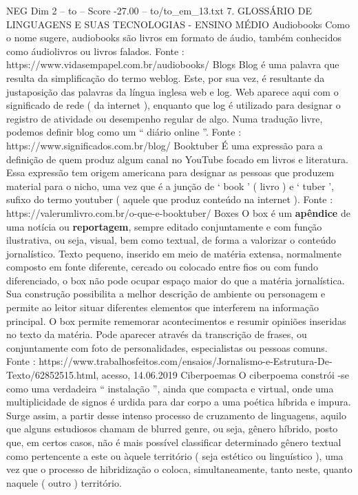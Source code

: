 \begin{textsample}{NEG Dim 2 – to – Score -27.00 – to/to\_em\_13.txt}  \label{ex:f2_neg_152}
7.
GLOSSÁRIO DE LINGUAGENS E SUAS TECNOLOGIAS - ENSINO MÉDIO Audiobooks Como o nome sugere, audiobooks são livros em formato de áudio, também conhecidos como áudiolivros ou livros falados.
Fonte : https://www.vidasempapel.com.br/audiobooks/ Blogs Blog é uma palavra que resulta da simplificação do termo weblog.
Este, por sua vez, é resultante da justaposição das palavras da língua inglesa web e log.
Web aparece aqui com o significado de rede ( da internet ), enquanto que log é utilizado para designar o registro de atividade ou desempenho regular de algo.
Numa tradução livre, podemos definir blog como um “ diário online ”.
Fonte : https://www.significados.com.br/blog/ Booktuber É uma expressão para a definição de quem produz algum canal no YouTube focado em livros e literatura.
Essa expressão tem origem americana para designar as pessoas que produzem material para o nicho, uma vez que é a junção de ‘ book ’ ( livro ) e ‘ tuber ’, sufixo do termo youtuber ( aquele que produz conteúdo na internet ).
Fonte : https://valerumlivro.com.br/o-que-e-booktuber/ Boxes O box é um \textbf{apêndice} de uma notícia ou \textbf{reportagem}, sempre editado conjuntamente e com função ilustrativa, ou seja, visual, bem como textual, de forma a valorizar o conteúdo jornalístico.
Texto pequeno, inserido em meio de matéria extensa, normalmente composto em fonte diferente, cercado ou colocado entre fios ou com fundo diferenciado, o box não pode ocupar espaço maior do que a matéria jornalística.
Sua construção possibilita a melhor descrição de ambiente ou personagem e permite ao leitor situar diferentes elementos que interferem na informação principal.
O box permite rememorar acontecimentos e resumir opiniões inseridas no texto da matéria.
Pode aparecer através da transcrição de frases, ou conjuntamente com foto de personalidades, especialistas ou pessoas comuns.
Fonte : https://www.trabalhosfeitos.com/ensaios/Jornalismo-e-Estrutura-De-Texto/62852515.html, acesso, 14.06.2019 Ciberpoemas O ciberpoema constrói -se como uma verdadeira “ instalação ”, ainda que compacta e virtual, onde uma multiplicidade de signos é urdida para dar corpo a uma poética híbrida e impura.
Surge assim, a partir desse intenso processo de cruzamento de linguagens, aquilo que alguns estudiosos chamam de blurred genre, ou seja, gênero híbrido, posto que, em certos casos, não é mais possível classificar determinado gênero textual como pertencente a este ou àquele território ( seja estético ou linguístico ), uma vez que o processo de hibridização o coloca, simultaneamente, tanto neste, quanto naquele ( outro ) território.

\end{textsample}
